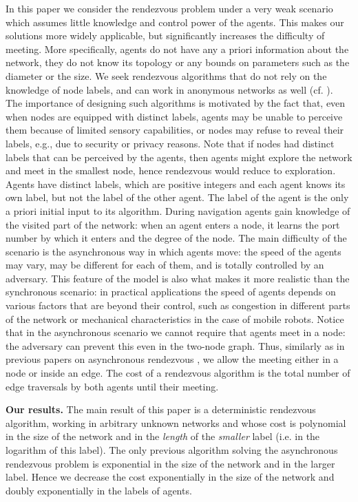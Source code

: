 \documentclass [11pt] {article}
\begin{document}
In this paper we consider the rendezvous problem under a very weak scenario which assumes little knowledge and control power of the agents.
This makes our solutions more widely applicable, but significantly increases the difficulty of meeting. More specifically, agents do not have any a priori information about the network, they do not know its topology or any bounds on parameters such as the diameter or the size. 
We seek rendezvous algorithms that do not
rely on the knowledge of node labels, and can work in anonymous networks as well  (cf. \cite{alpern02b}). 
The importance of designing such algorithms
is motivated by the fact that, even when nodes are equipped with distinct labels, agents may be unable to perceive them
because of limited sensory capabilities, 
or nodes may refuse to reveal their labels, e.g., due to security or privacy reasons.
Note that if nodes had distinct labels that can be perceived by the agents, then agents might explore the network and meet in the smallest node, hence rendezvous would reduce to exploration.
Agents have distinct labels, which are positive integers and each agent knows its own label, but not the label of the other agent. 
The label of the agent is the only a priori initial input to its algorithm. During navigation agents gain knowledge of the visited part of the network:
when an agent enters a node, it learns the port number by which it enters and the degree of the node.
The main difficulty of the scenario is the asynchronous way in which agents move: the speed of the agents may vary, may be different for each of them, and is totally controlled by an adversary.  This feature of the model is also what makes it more realistic than the synchronous scenario: in practical applications the speed of agents depends on various factors
that are beyond their control, such as congestion in different parts of the network or mechanical characteristics in the case of mobile robots.
Notice that in the asynchronous scenario we cannot require that agents meet in a node: the adversary can prevent this even in the two-node graph.
Thus, similarly as in previous papers on asynchronous rendezvous \cite{BCGIL,CCGL,CLP,DGKKPV,GP}, we allow the meeting either in
a node or inside an edge. 
The cost of a rendezvous algorithm is the total number of edge traversals by both agents until their
meeting.

\noindent
{\bf Our results.} The main result of this paper is a deterministic rendezvous algorithm, working in arbitrary unknown networks and whose cost is polynomial in the size of the network and in the {\em length} of the {\em smaller} label (i.e. in the logarithm of this label).
The only previous algorithm solving the asynchronous rendezvous problem \cite{CLP} is exponential in the size of the network and in the larger label.
Hence we decrease the cost exponentially in the size of the network and doubly exponentially in the labels of agents.
\end{document}
